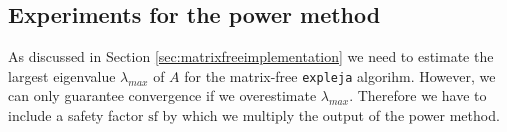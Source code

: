 \documentclass{scrartcl}
\begin{document}
	\subsection{Experiments for the power method}
	As discussed in Section \ref{sec:matrixfreeimplementation} we need to estimate the largest eigenvalue $\lambda_{max}$ of $A$ for the matrix-free \texttt{expleja} algorihm. However, we can only guarantee convergence if we overestimate $\lambda_{max}$. Therefore we have to include a safety factor $\text{sf}$ by which we multiply the output of the power method. 
	
\end{document}
